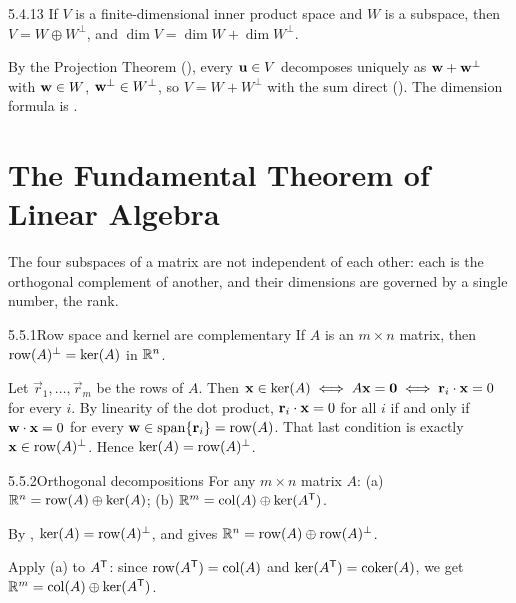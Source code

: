 \begin{thms}{5.4.13}{}
If $V$ is a finite-dimensional inner product space and $W$ is a subspace, then $V=W\oplus W^\perp$, and $\dim V=\dim W+\dim W^\perp$.
\end{thms}

\begin{prf}
By the Projection Theorem (), every $\mathbf{u}\in V$ decomposes uniquely as $\mathbf{w}+\mathbf{w}^\perp$ with $\mathbf{w}\in W$, $\mathbf{w}^\perp\in W^\perp$, so $V=W+W^\perp$ with the sum direct (). The dimension formula is .
\end{prf}

\section{The Fundamental Theorem of Linear Algebra}
\label{sec:5.5}

The four subspaces of a matrix are not independent of each other: each is the orthogonal complement of another, and their dimensions are governed by a single number, the rank.

\begin{thms}{5.5.1}{Row space and kernel are complementary}
If $A$ is an $m\times n$ matrix, then $\operatorname{row}(A)^\perp=\ker(A)$ in $\mathbb{R}^n$.
\end{thms}

\begin{prf}
Let $\vec{r}_1,\dots,\vec{r}_m$ be the rows of $A$. Then $\mathbf{x}\in\ker(A)\iff A\mathbf{x}=\mathbf{0}\iff\mathbf{r}_i\cdot\mathbf{x}=0$ for every $i$. By linearity of the dot product, $\mathbf{r}_i\cdot\mathbf{x}=0$ for all $i$ if and only if $\mathbf{w}\cdot\mathbf{x}=0$ for every $\mathbf{w}\in\operatorname{span}\{\mathbf{r}_i\}=\operatorname{row}(A)$. That last condition is exactly $\mathbf{x}\in\operatorname{row}(A)^\perp$. Hence $\ker(A)=\operatorname{row}(A)^\perp$.
\end{prf}

\begin{cors}{5.5.2}{Orthogonal decompositions}
For any $m\times n$ matrix $A$:
\textup{(a)} $\mathbb{R}^n=\operatorname{row}(A)\oplus\ker(A)$;
\textup{(b)} $\mathbb{R}^m=\operatorname{col}(A)\oplus\ker(A^{\mathsf{T}})$.
\end{cors}

\begin{prf}
 By , $\ker(A)=\operatorname{row}(A)^\perp$, and  gives $\mathbb{R}^n=\operatorname{row}(A)\oplus\operatorname{row}(A)^\perp$.

 Apply (a) to $A^{\mathsf{T}}$: since $\operatorname{row}(A^{\mathsf{T}})=\operatorname{col}(A)$ and $\ker(A^{\mathsf{T}})=\operatorname{coker}(A)$, we get $\mathbb{R}^m=\operatorname{col}(A)\oplus\ker(A^{\mathsf{T}})$.
\end{prf}

